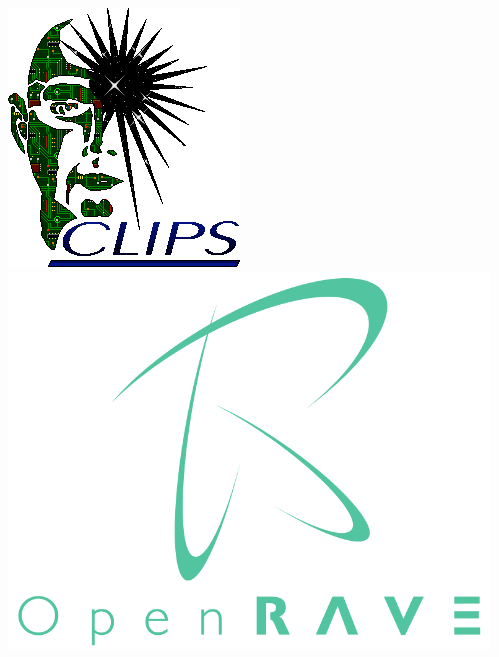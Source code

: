 \begin{frame}
\begin{columns}
\begin{column}{0.83\linewidth}
\begin{description}[]
  \end{description}
  \end{column}
  \begin{column}{0.17\linewidth}
  \includegraphics[width=\textwidth]{../thesis/img/CLIPS}
  \vspace{3.4cm}
  \includegraphics[width=\textwidth]{../thesis/img/openrave}
  \end{column}
  \end{columns}
\end{frame}

